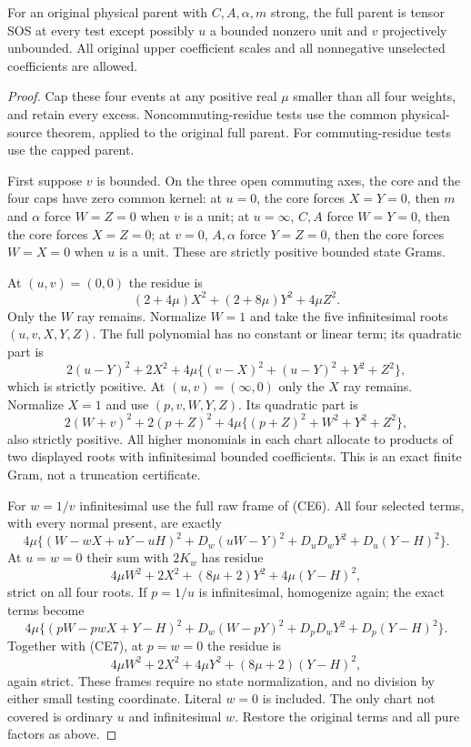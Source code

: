 \begin{theorem}
For an original physical parent with $C,A,\alpha,m$ strong, the full
parent is tensor SOS at every test except possibly $u$ a bounded nonzero
unit and $v$ projectively unbounded. All original upper coefficient
scales and all nonnegative unselected coefficients are allowed.
\end{theorem}
\begin{proof}
Cap these four events at any positive real $\mu$ smaller than all four
weights, and retain every excess. Noncommuting-residue tests use the
common physical-source theorem, applied to the original full parent.
For commuting-residue tests use the capped parent.

First suppose $v$ is bounded. On the three open commuting axes, the core
and the four caps have zero common kernel: at $u=0$, the core forces
$X=Y=0$, then $m$ and $\alpha$ force $W=Z=0$ when $v$ is a unit;
at $u=\infty$, $C,A$ force $W=Y=0$, then the core forces $X=Z=0$;
at $v=0$, $A,\alpha$ force $Y=Z=0$, then the core forces $W=X=0$
when $u$ is a unit. These are strictly positive bounded state Grams.

At $(u,v)=(0,0)$ the residue is
\[
 (2+4\mu)X^2+(2+8\mu)Y^2+4\mu Z^2.
\]
Only the $W$ ray remains. Normalize $W=1$ and take the five infinitesimal
roots $(u,v,X,Y,Z)$. The full polynomial has no constant or linear term;
its quadratic part is
\[
 2(u-Y)^2+2X^2+
 4\mu\{(v-X)^2+(u-Y)^2+Y^2+Z^2\},            \tag{CE11}
\]
which is strictly positive. At $(u,v)=(\infty,0)$ only the $X$ ray
remains. Normalize $X=1$ and use $(p,v,W,Y,Z)$. Its quadratic part is
\[
 2(W+v)^2+2(p+Z)^2+
 4\mu\{(p+Z)^2+W^2+Y^2+Z^2\},              \tag{CE12}
\]
also strictly positive. All higher monomials in each chart allocate to
products of two displayed roots with infinitesimal bounded coefficients.
This is an exact finite Gram, not a truncation certificate.

For $w=1/v$ infinitesimal use the full raw frame of (CE6). All four
selected terms, with every normal present, are exactly
\[
 4\mu\{(W-wX+uY-uH)^2+D_w(uW-Y)^2
              +D_uD_wY^2+D_u(Y-H)^2\}.        \tag{CE13}
\]
At $u=w=0$ their sum with $2K_w$ has residue
\[
 4\mu W^2+2X^2+(8\mu+2)Y^2+4\mu(Y-H)^2,    \tag{CE14}
\]
strict on all four roots. If $p=1/u$ is infinitesimal, homogenize again;
the exact terms become
\[
 4\mu\{(pW-pwX+Y-H)^2+D_w(W-pY)^2
              +D_pD_wY^2+D_p(Y-H)^2\}.        \tag{CE15}
\]
Together with (CE7), at $p=w=0$ the residue is
\[
 4\mu W^2+2X^2+4\mu Y^2+(8\mu+2)(Y-H)^2,    \tag{CE16}
\]
again strict. These frames require no state normalization, and no
division by either small testing coordinate. Literal $w=0$ is included.
The only chart not covered is ordinary $u$ and infinitesimal $w$.
Restore the original terms and all pure factors as above.
\end{proof}

